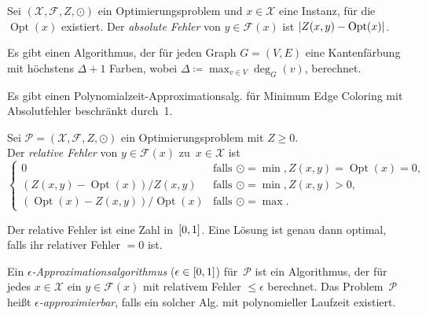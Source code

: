 \documentclass{cheat-sheet}
\newcommand{\Instances}{\mathcal{X}} %
\newcommand{\Feasible}{\mathcal{F}} %
\newcommand{\ObjFun}{Z} %
\newcommand{\Goal}{\odot} %
\newcommand{\OptTuple}{(\Instances{}, \Feasible{}, \ObjFun{}, \Goal)} %
\DeclareMathOperator{\Opt}{Opt} %
\newcommand{\Prob}{\mathcal{P}} %
\newcommand{\Algorithm}[1]{\textcolor{AlgorithmColor}{\textbf{#1}}}
\begin{document}

\begin{defn}
  Sei $\OptTuple$ ein Optimierungsproblem und $x \in \Instances$ eine Instanz, für die $\Opt(x)$ existiert.
  Der \emph{absolute Fehler} von $y \in \Feasible(x)$ ist $\abs{Z(x, y) - \Opt(x)}$.
\end{defn}

\begin{satz}[\Algorithm{Vizings Algorithmus}]
  Es gibt einen Algorithmus, der für jeden Graph $G = (V, E)$ eine Kantenfärbung mit höchstens $\Delta + 1$ Farben, wobei $\Delta \coloneqq {\max}_{v \in V} \deg_G(v)$, berechnet.
\end{satz}

\begin{kor}
  Es gibt einen Polynomialzeit-Approximationsalg. für Minimum Edge Coloring mit Absolutfehler beschränkt durch~1.
\end{kor}


\begin{defn}
  Sei $\Prob = \OptTuple$ ein Optimierungsproblem mit $Z \geq 0$. \\
  Der \emph{relative Fehler} von $y \in \Feasible(x)$ zu~$x \in \Instances$ ist
  \[
    \begin{cases}
      0 & \text{falls } \Goal = \min, \ObjFun(x, y) = \Opt(x) = 0, \\
      (\ObjFun(x, y) - \Opt(x)) / \ObjFun(x, y) & \text{falls } \Goal = \min, Z(x, y) > 0, \\
      (\Opt(x) - \ObjFun(x, y)) / \Opt(x) & \text{falls } \Goal = \max.
    \end{cases}
  \]
\end{defn}

\begin{bem}
  Der relative Fehler ist eine Zahl in~$\left[ 0, 1 \right]$.
  Eine Lösung ist genau dann optimal, falls ihr relativer Fehler $= 0$ ist.
\end{bem}

\begin{defn}
  Ein \emph{$\epsilon$-Approximationsalgorithmus} ($\epsilon \in \left[ 0, 1 \right]$) für~$\Prob$ ist ein Algorithmus, der für jedes $x \in \Instances$ ein $y \in \Feasible(x)$ mit relativem Fehler $\leq \epsilon$ berechnet.
  Das Problem~$\Prob$ heißt \emph{$\epsilon$-approximierbar}, falls ein solcher Alg. mit polynomieller Laufzeit existiert.
\end{defn}
\end{document}
